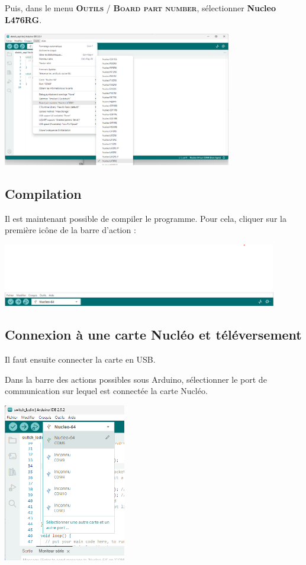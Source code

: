 \documentclass[a4paper,11pt,titlepage]{article} %
\begin{document}
Puis, dans le menu \textsc{\textbf{Outils} / \textbf{Board part number}}, sélectionner \textbf{Nucleo L476RG}.

\begin{center}
	\includegraphics[width=0.75\textwidth]{images/arduino_cartes_nucleo_lxxx.png}
\end{center}

\subsection{Compilation}

Il est maintenant possible de compiler le programme. Pour cela, cliquer sur la première icône de la barre d'action :

\begin{center}
	\includegraphics[width=0.9\textwidth]{images/arduino_compile_run.png}
\end{center}

\bigskip


\subsection{Connexion à une carte Nucléo et téléversement}

Il faut ensuite connecter la carte en USB.

Dans la barre des actions possibles sous Arduino, sélectionner le port de communication sur lequel est connectée la carte Nucléo.

\begin{center}
	\includegraphics[width=0.4\textwidth]{images/arduino_cartes_nucleo_comXX.png}
\end{center}
\end{document}

